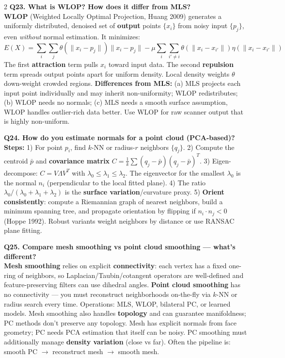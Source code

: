 \begin{paracol}{2}
\textbf{Q23. What is WLOP? How does it differ from MLS?}\\
\textbf{WLOP} (Weighted Locally Optimal Projection, Huang 2009) generates a uniformly distributed, denoised set of \textbf{output} points $\{x_i\}$ from noisy input $\{p_j\}$, even \textit{without} normal estimation. It minimizes:
\[
E(X) = \sum_i \sum_j \theta(\|x_i-p_j\|)\|x_i-p_j\| - \mu \sum_i \sum_{i'\neq i} \theta(\|x_i-x_{i'}\|)\eta(\|x_i-x_{i'}\|)
\]
The first \textbf{attraction} term pulls $x_i$ toward input data. The second \textbf{repulsion} term spreads output points apart for uniform density. Local density weights $\theta$ down-weight crowded regions. \textbf{Differences from MLS:} (a) MLS projects each input point individually and may inherit non-uniformity; WLOP redistributes; (b) WLOP needs no normals; (c) MLS needs a smooth surface assumption, WLOP handles outlier-rich data better. Use WLOP for raw scanner output that is highly non-uniform.

\textbf{Q24. How do you estimate normals for a point cloud (PCA-based)?}\\
\textbf{Steps:} 1) For point $p_i$, find $k$-NN or radius-$r$ neighbors $\{q_j\}$. 2) Compute the centroid $\bar p$ and \textbf{covariance matrix} $C=\tfrac{1}{k}\sum (q_j-\bar p)(q_j-\bar p)^T$. 3) Eigen-decompose: $C=V\Lambda V^T$ with $\lambda_0\le\lambda_1\le\lambda_2$. The eigenvector for the smallest $\lambda_0$ is the normal $n_i$ (perpendicular to the local fitted plane). 4) The ratio $\lambda_0/(\lambda_0+\lambda_1+\lambda_2)$ is the \textbf{surface variation}/curvature proxy. 5) \textbf{Orient consistently}: compute a Riemannian graph of nearest neighbors, build a minimum spanning tree, and propagate orientation by flipping if $n_i\cdot n_j<0$ (Hoppe 1992). Robust variants weight neighbors by distance or use RANSAC plane fitting.

\textbf{Q25. Compare mesh smoothing vs point cloud smoothing — what's different?}\\
\textbf{Mesh smoothing} relies on explicit \textbf{connectivity}: each vertex has a fixed one-ring of neighbors, so Laplacian/Taubin/cotangent operators are well-defined and feature-preserving filters can use dihedral angles. \textbf{Point cloud smoothing} has no connectivity — you must reconstruct neighborhoods on-the-fly via $k$-NN or radius search every time. Operations: MLS, WLOP, bilateral PC, or learned models. Mesh smoothing also handles \textbf{topology} and can guarantee manifoldness; PC methods don't preserve any topology. Mesh has explicit normals from face geometry; PC needs PCA estimation that itself can be noisy. PC smoothing must additionally manage \textbf{density variation} (close vs far). Often the pipeline is: smooth PC $\to$ reconstruct mesh $\to$ smooth mesh.


\end{paracol}
